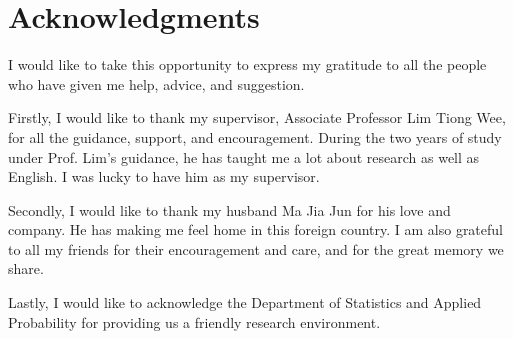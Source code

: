 \chapter{Acknowledgments}

I would like to take this opportunity to express my gratitude to all the people who have given me help, advice, and suggestion. 

Firstly, I would like to thank my supervisor, Associate Professor Lim Tiong Wee, for all the guidance, support, and encouragement. During the two years of study under Prof. Lim's guidance, he has taught me a lot about research as well as English. I was lucky to have him as my supervisor. 

Secondly, I would like to thank my husband Ma Jia Jun for his love and company. He has making me feel home in this foreign country. I am also grateful to all my friends for their encouragement and care, and for the great memory we share. 

Lastly, I would like to acknowledge the Department of Statistics and Applied Probability for providing us a friendly research environment. 


